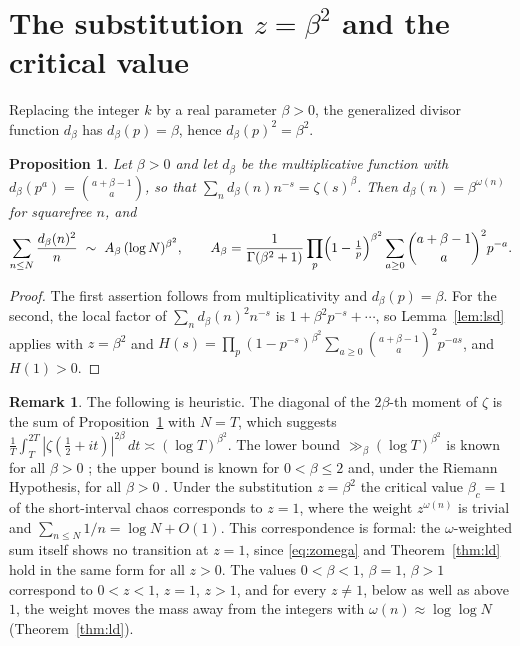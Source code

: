 \documentclass[11pt]{amsart}
\newtheorem{proposition}[theorem]{Proposition}
\theoremstyle{definition}
\newtheorem{remark}[theorem]{Remark}
\newcommand{\half}{\tfrac12}
\newcommand{\loglog}{\log\log}
\begin{document}
\section{The substitution \texorpdfstring{$z=\beta^2$}{z=beta\textasciicircum 2} and the critical value}\label{sec:dict}

Replacing the integer $k$ by a real parameter $\beta>0$, the generalized divisor function $d_\beta$ has
$d_\beta(p)=\beta$, hence $d_\beta(p)^2=\beta^2$.

\begin{proposition}\label{prop:dict}
Let $\beta>0$ and let $d_\beta$ be the multiplicative function with $d_\beta(p^a)=\binom{a+\beta-1}{a}$, so
that $\sum_nd_\beta(n)n^{-s}=\zeta(s)^\beta$. Then $d_\beta(n)=\beta^{\omega(n)}$ for squarefree $n$, and
\[
\sum_{n\le N}\frac{d_\beta(n)^2}{n}\ \sim\ A_\beta\,(\log N)^{\beta^2},\qquad
A_\beta=\frac1{\Gamma(\beta^2+1)}\prod_p\Bigl(1-\tfrac1p\Bigr)^{\beta^2}\sum_{a\ge0}\binom{a+\beta-1}{a}^2p^{-a}.
\]
\end{proposition}
\begin{proof}
The first assertion follows from multiplicativity and $d_\beta(p)=\beta$. For the second, the local factor of
$\sum_nd_\beta(n)^2n^{-s}$ is $1+\beta^2p^{-s}+\cdots$, so Lemma~\ref{lem:lsd} applies with $z=\beta^2$ and
$H(s)=\prod_p(1-p^{-s})^{\beta^2}\sum_{a\ge0}\binom{a+\beta-1}{a}^2p^{-as}$, and $H(1)>0$.
\end{proof}

\begin{remark}\label{rem:dict}
The following is heuristic. The diagonal of the $2\beta$-th moment of $\zeta$ is the sum of
Proposition~\ref{prop:dict} with $N=T$, which suggests
$\frac1T\int_T^{2T}|\zeta(\half+it)|^{2\beta}\,dt\asymp(\log T)^{\beta^2}$. The lower bound
$\gg_\beta(\log T)^{\beta^2}$ is known for all $\beta>0$ \cite{HS}; the upper bound is known for $0<\beta\le2$
\cite{HRS} and, under the Riemann Hypothesis, for all $\beta>0$ \cite{HarperMoments}. Under the
substitution $z=\beta^2$ the critical value $\beta_c=1$ of the short-interval chaos corresponds to $z=1$, where
the weight $z^{\omega(n)}$ is trivial and $\sum_{n\le N}1/n=\log N+O(1)$. This correspondence is formal: the
$\omega$-weighted sum itself shows no transition at $z=1$, since \eqref{eq:zomega} and Theorem~\ref{thm:ld} hold
in the same form for all $z>0$. The values $0<\beta<1$, $\beta=1$, $\beta>1$ correspond to $0<z<1$, $z=1$, $z>1$,
and for every $z\ne1$, below as well as above $1$, the weight moves the mass away from the integers with
$\omega(n)\approx\loglog N$ (Theorem~\ref{thm:ld}).
\end{remark}
\end{document}
